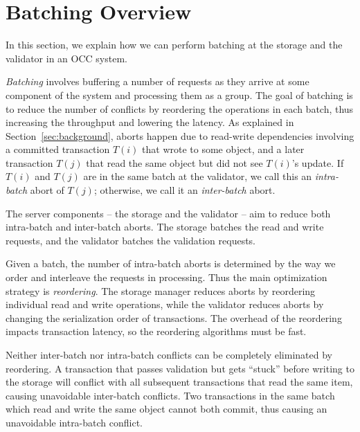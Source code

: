 \section{Batching Overview}\label{sec:overview}

In this section, we explain how we can perform batching at the storage and the validator in an OCC system. 

\emph{Batching} involves buffering a number of requests as they arrive at some component of the system and processing them as a group. The goal of batching is to reduce the number of conflicts by reordering the operations in each batch, thus increasing the throughput and lowering the latency. As explained in Section~\ref{sec:background}, aborts happen due to read-write dependencies involving a committed transaction $T(i)$ that wrote to some object, and a later transaction $T(j)$ that read the same object but did not see $T(i)$'s update. If $T(i)$ and $T(j)$ are in the same batch at the validator, we call this an \emph{intra-batch} abort of $T(j)$; otherwise, we call it an \emph{inter-batch} abort.

The server components -- the storage and the validator -- aim to reduce both intra-batch and inter-batch aborts. The storage batches the read and write requests, and the validator batches the validation requests.

Given a batch, the number of intra-batch aborts is determined by the way we order and interleave the requests in processing. Thus the main optimization strategy is \emph{reordering}. The storage manager reduces aborts by reordering individual read and write operations, while the validator reduces aborts by changing the serialization order of transactions. The overhead of the reordering impacts transaction latency, so the reordering algorithms must be fast.

Neither inter-batch nor intra-batch conflicts can be completely eliminated by reordering. A transaction that passes validation but gets ``stuck'' before writing to the storage will conflict with all subsequent transactions that read the same item, causing unavoidable inter-batch conflicts. Two transactions in the same batch which read and write the same object cannot both commit, thus causing an unavoidable intra-batch conflict.


